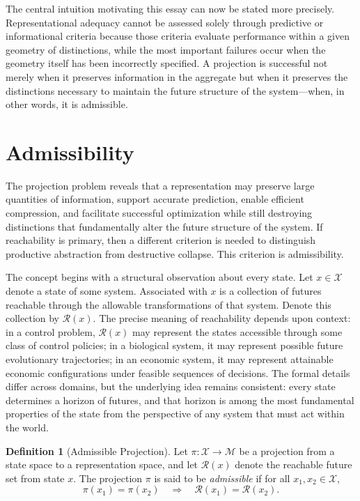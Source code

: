 \documentclass[12pt,a4paper]{article}
\theoremstyle{plain}
\theoremstyle{definition}
\newtheorem{definition}{Definition}
\theoremstyle{remark}
\begin{document}
The central intuition motivating this essay can now be stated more precisely.
Representational adequacy cannot be assessed solely through predictive or
informational criteria because those criteria evaluate performance within a
given geometry of distinctions, while the most important failures occur when
the geometry itself has been incorrectly specified. A projection is successful
not merely when it preserves information in the aggregate but when it
preserves the distinctions necessary to maintain the future structure of the
system---when, in other words, it is admissible.

\section{Admissibility}

The projection problem reveals that a representation may preserve large
quantities of information, support accurate prediction, enable efficient
compression, and facilitate successful optimization while still destroying
distinctions that fundamentally alter the future structure of the system. If
reachability is primary, then a different criterion is needed to distinguish
productive abstraction from destructive collapse. This criterion is
admissibility.

The concept begins with a structural observation about every state. Let
$x \in \mathcal{X}$ denote a state of some system. Associated with $x$ is
a collection of futures reachable through the allowable transformations of
that system. Denote this collection by $\mathcal{R}(x)$. The precise
meaning of reachability depends upon context: in a control problem,
$\mathcal{R}(x)$ may represent the states accessible through some class of
control policies; in a biological system, it may represent possible future
evolutionary trajectories; in an economic system, it may represent attainable
economic configurations under feasible sequences of decisions. The formal
details differ across domains, but the underlying idea remains consistent:
every state determines a horizon of futures, and that horizon is among the
most fundamental properties of the state from the perspective of any system
that must act within the world.

\begin{definition}[Admissible Projection]
Let $\pi : \mathcal{X} \rightarrow \mathcal{M}$ be a projection from a
state space to a representation space, and let $\mathcal{R}(x)$ denote the
reachable future set from state $x$. The projection $\pi$ is said to be
\emph{admissible} if for all $x_1, x_2 \in \mathcal{X}$,
\[
  \pi(x_1) = \pi(x_2)
  \quad\Longrightarrow\quad
  \mathcal{R}(x_1) = \mathcal{R}(x_2).
\]
\end{definition}
\end{document}
